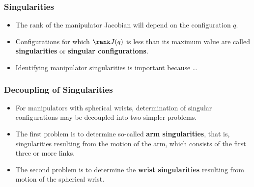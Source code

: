 \begin{frame}
    \frametitle{Singularities}

    \begin{itemize}
        \item The rank of the manipulator Jacobian will depend on the
        configuration $q$.
        \item Configurations for which $\rank J(q)$ is less than its maximum
        value are called \textbf{singularities} or \textbf{singular
        configurations}.
        \item Identifying manipulator singularities is important because \ldots
    \end{itemize}
\end{frame}


\begin{frame}
    \frametitle{Decoupling of Singularities}

    \begin{itemize}
        \item For manipulators with spherical wrists, determination of singular
        configurations may be decoupled into two simpler problems.
        \item The first problem is to determine so-called \textbf{arm
        singularities}, that is, singularities resulting from the motion of the
        arm, which consists of the first three or more links.
        \item The second problem is to determine the \textbf{wrist
        singularities} resulting from motion of the spherical wrist.
    \end{itemize}
\end{frame}


